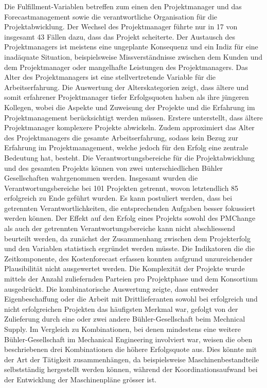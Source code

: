 \newline\newline
Die Fulfillment-Variablen betreffen zum einen den Projektmanager und das Forecastmanagement sowie die verantwortliche Organisation für die Projektabwicklung. Der Wechsel des Projektmanager führte nur in 17 von insgesamt 43 Fällen dazu, dass das Projekt scheiterte. Der Austausch des Projektmanagers ist meistens eine ungeplante Konsequenz und ein Indiz für eine inadäquate Situation, beispielsweise Missverständnisse zwischen dem Kunden und dem Projektmanager oder mangelhafte Leistungen des Projektmanagers. Das Alter des Projektmanagers ist eine stellvertretende Variable für die Arbeitserfahrung. Die Auswertung der Alterskategorien zeigt, dass ältere und somit erfahrener Projektmanager tiefer Erfolgsquoten haben als ihre jüngeren Kollegen, wobei die Aspekte und Zuweisung der Projekte und die Erfahrung im Projektmanagement berücksichtigt werden müssen. Erstere unterstellt, dass ältere Projektmanager komplexere Projekte abwickeln. Zudem approximiert das Alter des Projektmanagers die gesamte Arbeitserfahrung, sodass kein Bezug zur Erfahrung im Projektmanagement, welche jedoch für den Erfolg eine zentrale Bedeutung hat, besteht. 
\newline Die Verantwortungsbereiche für die Projektabwicklung und des gesamten Projekts können von zwei unterschiedlichen Bühler Gesellschaften wahrgenommen werden. Insgesamt wurden die Verantwortungsbereiche bei 101 Projekten getrennt, wovon letztendlich 85 erfolgreich zu Ende geführt wurden. Es kann postuliert werden, dass bei getrennten Verantwortlichkeiten, die entsprechenden Aufgaben besser fokussiert werden können. 
\newline Der Effekt auf den Erfolg eines Projekts sowohl des PMChange als auch der getrennten Verantwortungsbereiche kann nicht abschliessend beurteilt werden, da zunächst der Zusammenhang zwischen dem Projekterfolg und den Variablen statistisch ergründet werden müsste. Die Indikatoren die die Zeitkomponente, des Kostenforecast erfassen konnten aufgrund unzureichender Plausibilität nicht ausgewertet werden. 
\newline\newline
Die Komplexität der Projekte wurde mittels der Anzahl zuliefernden Parteien pro Projektphase und dem Konsortium ausgedrückt. Die kombinatorische Auswertung zeigte, dass entweder Eigenbeschaffung oder die Arbeit mit Drittlieferanten sowohl bei erfolgreich und nicht erfolgreichen Projekten das häufigsten Merkmal war, gefolgt von der Zulieferung durch eine oder zwei andere Bühler-Gesellschaft beim Mechnical Supply. Im Vergleich zu Kombinationen, bei denen mindestens eine weitere Bühler-Gesellschaft im Mechanical Engineering involviert war, weisen die oben beschriebenen drei Kombinationen die höhere Erfolgsquote aus. Dies könnte mit der Art der Tätigkeit zusammenhängen, da beispielsweise Maschinenbestandteile selbstständig hergestellt werden können, während der Koordinationsaufwand bei der Entwicklung der Maschinenpläne grösser ist.
